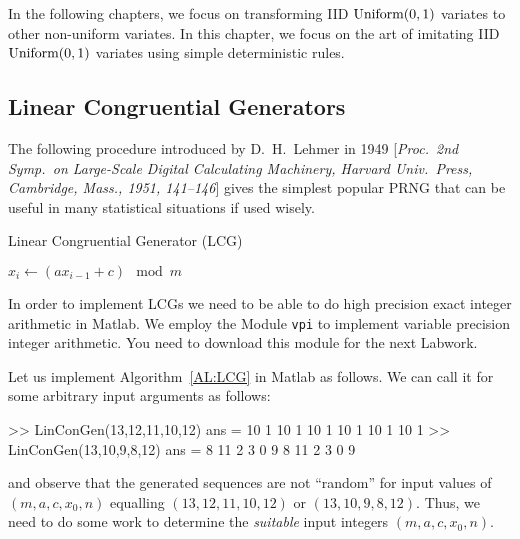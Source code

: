 In the following chapters, we focus on transforming IID $\mbox{{\rm Uniform}}(0,1)$ variates to other non-uniform variates.  In this chapter, we focus on the art of imitating IID $\mbox{{\rm Uniform}}(0,1)$ variates using simple deterministic rules.  

\subsection{Linear Congruential Generators}\label{S:RNGs}

The following procedure introduced by D.~H.~Lehmer in 1949 [{\em Proc.~2nd Symp.~on Large-Scale Digital Calculating Machinery, Harvard Univ.~Press, Cambridge, Mass., 1951, 141--146}] gives the simplest popular PRNG that can be useful in many statistical situations if used wisely.

\begin{algorithm}[htpb]
\caption{Linear Congruential Generator (LCG)}
\label{AL:LCG}
\begin{algorithmic}[1]
\STATE $x_i \gets (a x_{i-1} + c) \mod m$
\ENDFOR
{}
\end{algorithmic}
\end{algorithm}

In order to implement LCGs we need to be able to do high precision exact integer arithmetic in {\sc Matlab}.  We employ the Module {\tt vpi} to implement variable precision integer arithmetic.  You need to download this module for the next Labwork.

\begin{labwork}\label{LW:GenericLCGS}
Let us implement Algorithm~\ref{AL:LCG} in {\sc Matlab} as follows.
We can call it for some arbitrary input arguments as follows:
\begin{VrbM}
>> LinConGen(13,12,11,10,12)
ans =    10     1    10     1    10     1    10     1    10     1    10     1
>> LinConGen(13,10,9,8,12)
ans =     8    11     2     3     0     9     8    11     2     3     0     9
\end{VrbM}
and observe that the generated sequences are not ``random'' for input values of $(m,a,c,x_0,n)$ equalling $(13,12,11,10,12)$ or $(13,10,9,8,12)$.  Thus, we need to do some work to determine the {\em suitable} input integers $(m,a,c,x_0,n)$.
\end{labwork}

